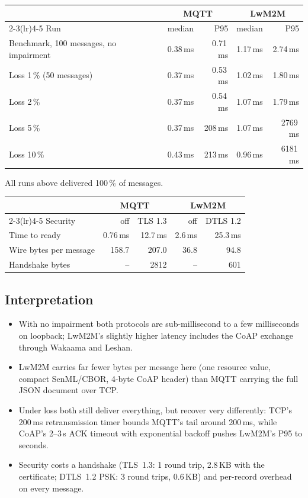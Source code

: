\documentclass[11pt,a4paper]{article}
\begin{document}
\begin{center}
\begin{tabular}{@{}lrrrr@{}}
\toprule
 & \multicolumn{2}{c}{MQTT} & \multicolumn{2}{c}{LwM2M} \\
\cmidrule(lr){2-3}\cmidrule(lr){4-5}
Run & median & P95 & median & P95 \\
\midrule
Benchmark, 100 messages, no impairment & 0.38\,ms & 0.71\,ms & 1.17\,ms & 2.74\,ms \\
Loss 1\,\% (50 messages) & 0.37\,ms & 0.53\,ms & 1.02\,ms & 1.80\,ms \\
Loss 2\,\% & 0.37\,ms & 0.54\,ms & 1.07\,ms & 1.79\,ms \\
Loss 5\,\% & 0.37\,ms & 208\,ms & 1.07\,ms & 2769\,ms \\
Loss 10\,\% & 0.43\,ms & 213\,ms & 0.96\,ms & 6181\,ms \\
\bottomrule
\end{tabular}
\end{center}
All runs above delivered 100\,\% of messages.

\begin{center}
\begin{tabular}{@{}lrrrr@{}}
\toprule
 & \multicolumn{2}{c}{MQTT} & \multicolumn{2}{c}{LwM2M} \\
\cmidrule(lr){2-3}\cmidrule(lr){4-5}
Security & off & TLS 1.3 & off & DTLS 1.2 \\
\midrule
Time to ready & 0.76\,ms & 12.7\,ms & 2.6\,ms & 25.3\,ms \\
Wire bytes per message & 158.7 & 207.0 & 36.8 & 94.8 \\
Handshake bytes & -- & 2812 & -- & 601 \\
\bottomrule
\end{tabular}
\end{center}

\subsection*{Interpretation}
\begin{itemize}
  \item With no impairment both protocols are sub-millisecond to a few
        milliseconds on loopback; LwM2M's slightly higher latency includes the
        CoAP exchange through Wakaama and Leshan.
  \item LwM2M carries far fewer bytes per message here (one resource value,
        compact SenML/CBOR, 4-byte CoAP header) than MQTT carrying the full
        JSON document over TCP.
  \item Under loss both still deliver everything, but recover very
        differently: TCP's 200\,ms retransmission timer bounds MQTT's tail
        around 200\,ms, while CoAP's 2--3\,s ACK timeout with exponential
        backoff pushes LwM2M's P95 to seconds.
  \item Security costs a handshake (TLS~1.3: 1 round trip, 2.8\,KB with the
        certificate; DTLS~1.2 PSK: 3 round trips, 0.6\,KB) and per-record
        overhead on every message.
\end{itemize}
\end{document}
